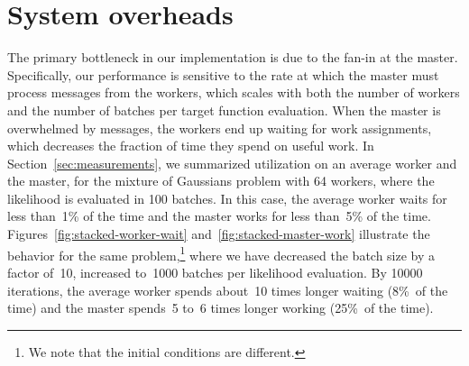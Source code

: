 \documentclass[angelino.tex]{subfiles}
\begin{document}
\section{System overheads}
\label{sec:overheads}




The primary bottleneck in our implementation is due to the fan-in at the master.
Specifically, our performance is sensitive to the rate at which the master
must process messages from the workers, which scales with both the number of
workers and the number of batches per target function evaluation.
When the master is overwhelmed by messages, the workers end up waiting for work
assignments, which decreases the fraction of time they spend on useful work.
In Section~\ref{sec:measurements}, we summarized utilization on an average
worker and the master, for the mixture of Gaussians problem with 64 workers,
where the likelihood is evaluated in 100 batches.
In this case, the average worker waits for less than~1\% of the time and
the master works for less than~5\% of the time.
Figures~\ref{fig:stacked-worker-wait} and~\ref{fig:stacked-master-work}
illustrate the behavior for the same problem,\footnote{We note that the
initial conditions are different.} where we have decreased the batch 
size by a factor of~10, \ie increased to~1000 batches per likelihood evaluation.
By 10000 iterations, the average worker spends about~10 times longer waiting
(8\%~of the time) and the master spends~5 to~6 times longer working 
(25\%~of the time).
\end{document}
